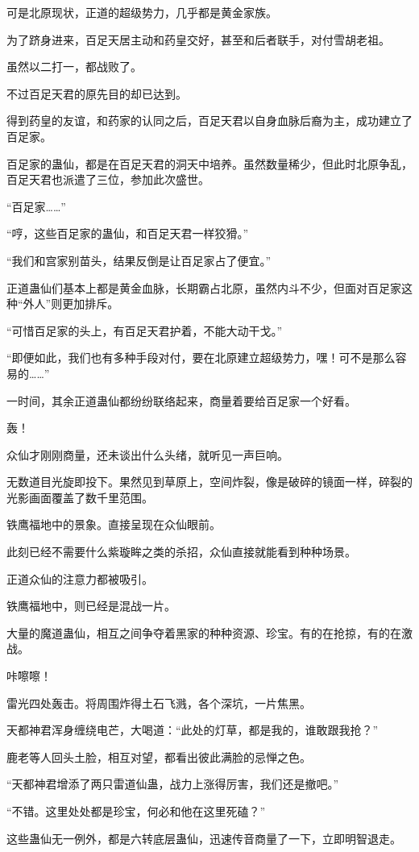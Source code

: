 \begin{this_body}
可是北原现状，正道的超级势力，几乎都是黄金家族。

为了跻身进来，百足天居主动和药皇交好，甚至和后者联手，对付雪胡老祖。

虽然以二打一，都战败了。

不过百足天君的原先目的却已达到。

得到药皇的友谊，和药家的认同之后，百足天君以自身血脉后裔为主，成功建立了百足家。

百足家的蛊仙，都是在百足天君的洞天中培养。虽然数量稀少，但此时北原争乱，百足天君也派遣了三位，参加此次盛世。

“百足家……”

“哼，这些百足家的蛊仙，和百足天君一样狡猾。”

“我们和宫家别苗头，结果反倒是让百足家占了便宜。”

正道蛊仙们基本上都是黄金血脉，长期霸占北原，虽然内斗不少，但面对百足家这种“外人”则更加排斥。

“可惜百足家的头上，有百足天君护着，不能大动干戈。”

“即便如此，我们也有多种手段对付，要在北原建立超级势力，嘿！可不是那么容易的……”

一时间，其余正道蛊仙都纷纷联络起来，商量着要给百足家一个好看。

轰！

众仙才刚刚商量，还未谈出什么头绪，就听见一声巨响。

无数道目光旋即投下。果然见到草原上，空间炸裂，像是破碎的镜面一样，碎裂的光影画面覆盖了数千里范围。

铁鹰福地中的景象。直接呈现在众仙眼前。

此刻已经不需要什么紫璇眸之类的杀招，众仙直接就能看到种种场景。

正道众仙的注意力都被吸引。

铁鹰福地中，则已经是混战一片。

大量的魔道蛊仙，相互之间争夺着黑家的种种资源、珍宝。有的在抢掠，有的在激战。

咔嚓嚓！

雷光四处轰击。将周围炸得土石飞溅，各个深坑，一片焦黑。

天都神君浑身缠绕电芒，大喝道：“此处的灯草，都是我的，谁敢跟我抢？”

鹿老等人回头土脸，相互对望，都看出彼此满脸的忌惮之色。

“天都神君增添了两只雷道仙蛊，战力上涨得厉害，我们还是撤吧。”

“不错。这里处处都是珍宝，何必和他在这里死磕？”

这些蛊仙无一例外，都是六转底层蛊仙，迅速传音商量了一下，立即明智退走。


\end{this_body}
